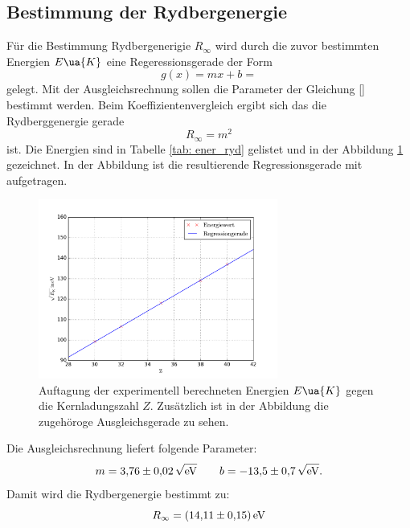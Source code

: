 \subsection{Bestimmung der Rydbergenergie}
Für die Bestimmung Rydbergenerigie $R_\infty$ wird durch die zuvor
bestimmten Energien $E\ua{K}$ eine Regeressionsgerade der Form
\begin{equation*}
  g(x)=mx+b=
\end{equation*}
gelegt. Mit der Ausgleichsrechnung sollen die Parameter der Gleichung \eqref{}
bestimmt werden. Beim Koeffizientenvergleich ergibt sich das die Rydberggenergie
gerade
\begin{equation*}
  R_\infty=m^2
\end{equation*}
ist.
Die Energien sind in Tabelle \ref{tab: ener_ryd} gelistet
und in der Abbildung \ref{fig: ryd_ener} gezeichnet. In der Abbildung ist
die resultierende Regressionsgerade mit aufgetragen.

\begin{figure}
  \centering
  \includegraphics[width=0.7\textwidth]{../Messdaten/energie_z.pdf}
  \caption{Auftagung der experimentell berechneten Energien $E\ua{K}$ gegen die Kernladungszahl $Z$. Zusätzlich ist in der Abbildung die zugehöroge Ausgleichsgerade zu sehen. } %
  \label{fig: ryd_ener}
\end{figure}
Die Ausgleichsrechnung liefert folgende Parameter:
\begin{equation*}
m=\num{3.76\pm0.02}\,\sqrt{\si{\eV}} \qquad b=\num{-13.5\pm0.7}\,\sqrt{\si{\eV}}.
\end{equation*}
Damit wird die Rydbergenergie bestimmt zu:
\begin{equation}
  R_\infty=\SI{14.11\pm0.15}{\eV}
\end{equation}
